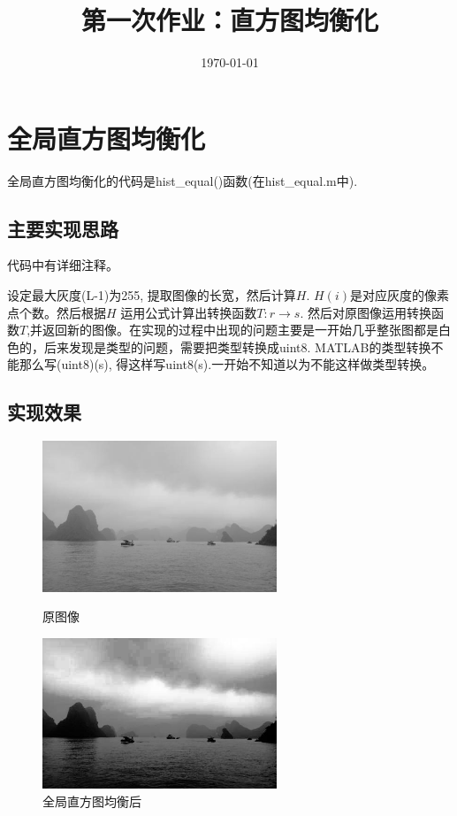 \documentclass[11pt, a4paper, UTF8]{ctexart}
\title{第一次作业：直方图均衡化}
\date{\today}     %
\begin{document}
\maketitle


\section{全局直方图均衡化}

全局直方图均衡化的代码是hist\_equal()函数(在hist\_equal.m中).

\subsection{主要实现思路}
代码中有详细注释。\par
设定最大灰度(L-1)为255, 提取图像的长宽，然后计算$H$. $H(i)$是对应灰度的像素点个数。然后根据$H$ 运用公式计算出转换函数$T: r \rightarrow s$. 然后对原图像运用转换函数$T$,并返回新的图像。在实现的过程中出现的问题主要是一开始几乎整张图都是白色的，后来发现是类型的问题，需要把类型转换成uint8. MATLAB的类型转换不能那么写(uint8)(s), 得这样写uint8(s).一开始不知道以为不能这样做类型转换。


\subsection{实现效果}
\begin{figure}[H]
  \centering
  \begin{minipage}[t]{0.48\textwidth}
  \centering
  \includegraphics[width=7cm]{gray.jpg}
  \caption{原图像}
  \end{minipage}
  \begin{minipage}[t]{0.48\textwidth}
  \centering
  \includegraphics[width=7cm]{gray_global_converted.jpg}
  \caption{全局直方图均衡后}
  \end{minipage}
\end{figure}
\end{document}
